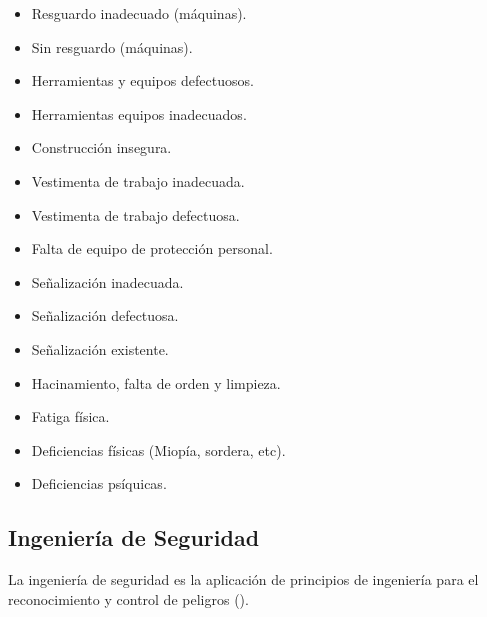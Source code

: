 \begin{table}[H]
    \begin{minipage}[t]{0.48\textwidth}
        \raggedright
        \begin{itemize}[wide=0pt]
            \item Resguardo inadecuado (máquinas).
            \item Sin resguardo (máquinas).
            \item Herramientas y equipos defectuosos.
            \item Herramientas  equipos inadecuados.
            \item Construcción insegura.
            \item Vestimenta de trabajo inadecuada.
            \item Vestimenta de trabajo defectuosa.
            \item Falta de equipo de protección personal.
        \end{itemize}
    \end{minipage}
    \hfill
    \begin{minipage}[t]{0.48\textwidth}
        \raggedright
        \begin{itemize}[wide=0pt]
            \item Señalización inadecuada.
            \item Señalización defectuosa.
            \item Señalización existente.
            \item Hacinamiento, falta de orden y limpieza.
            \item Fatiga física.
            \item Deficiencias físicas (Miopía, sordera, etc).
            \item Deficiencias psíquicas.
        \end{itemize}
    \end{minipage}
\end{table}

\subsection{Ingeniería de Seguridad}
La ingeniería de seguridad es la aplicación de principios de ingeniería para el reconocimiento y control de peligros (\cite{brauer2022safety}).

